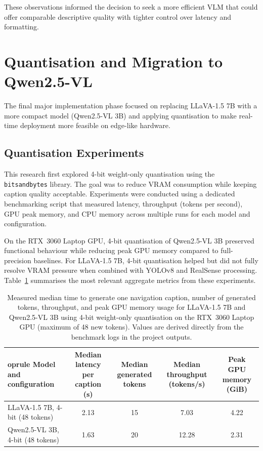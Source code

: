 \documentclass[11pt,a4paper]{article}
\newcommand{\code}[1]{\texttt{#1}}
\begin{document}
These observations informed the decision to seek a more efficient VLM that could offer comparable descriptive quality with tighter control over latency and formatting.

\section{Quantisation and Migration to Qwen2.5-VL}

The final major implementation phase focused on replacing LLaVA-1.5 7B with a more compact model (Qwen2.5-VL 3B) and applying quantisation to make real-time deployment more feasible on edge-like hardware.

\subsection{Quantisation Experiments}

This research first explored 4-bit weight-only quantisation using the \code{bitsandbytes} library. The goal was to reduce VRAM consumption while keeping caption quality acceptable. Experiments were conducted using a dedicated benchmarking script that measured latency, throughput (tokens per second), GPU peak memory, and CPU memory across multiple runs for each model and configuration.

On the RTX~3060 Laptop GPU, 4-bit quantisation of Qwen2.5-VL 3B preserved functional behaviour while reducing peak GPU memory compared to full-precision baselines. For LLaVA-1.5 7B, 4-bit quantisation helped but did not fully resolve VRAM pressure when combined with YOLOv8 and RealSense processing. Table~\ref{tab:quant-comparison} summarises the most relevant aggregate metrics from these experiments.

\begin{table}[h]
  \centering
  \small
  \begin{tabular}{lcccc}
    	oprule
    Model and configuration & Median latency per caption (s) & Median generated tokens & Median throughput (tokens/s) & Peak GPU memory (GiB) \\
    \midrule
    LLaVA-1.5 7B, 4-bit (48 tokens) & 2.13 & 15 & 7.03 & 4.22 \\
    Qwen2.5-VL 3B, 4-bit (48 tokens) & 1.63 & 20 & 12.28 & 2.31 \\
    \bottomrule
  \end{tabular}
  \caption{Measured median time to generate one navigation caption, number of generated tokens, throughput, and peak GPU memory usage for LLaVA-1.5 7B and Qwen2.5-VL 3B using 4-bit weight-only quantisation on the RTX~3060 Laptop GPU (maximum of 48 new tokens). Values are derived directly from the benchmark logs in the project outputs.}
  \label{tab:quant-comparison}
\end{table}
\end{document}
